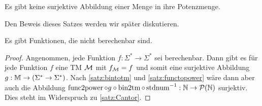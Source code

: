 \begin{Satz}[Cantor]\label{satz:Cantor}
	Es gibt keine surjektive Abbildung einer Menge in ihre Potenzmenge.
\end{Satz}
Den Beweis dieses Satzes werden wir später diskutieren.


\begin{Satz}[name={[nicht berechenbare Funktionen]}]\label{satz:nichtBerechenbar}
	Es gibt Funktionen, die nicht berechenbar sind.
\end{Satz}


\begin{proof}
	Angenommen, jede Funktion $f:\Sigma^*\rightarrow\Sigma^*$ sei berechenbar.
	Dann gibt es für jede Funktion $f$ eine \ac{TM} $\mathcal{M}$ mit $f_{\mathcal{M}}=f$ und somit eine surjektive Abbildung $g:\mathbb{M}\rightarrow(\Sigma^*\rightarrow\Sigma^*)$.
	Nach \autoref{satz:bintotm} und \autoref{satz:functopower} wäre dann aber auch die Abbildung $\operatorname{func2power}\circ g \circ\operatorname{bin2tm}\circ \operatorname{stdnum}^{-1}:\mathbb{N}\rightarrow\mathcal{P}(\mathbb{N})$ surjektiv.
	Dies steht im Widerspruch zu \autoref{satz:Cantor}.
\end{proof}


